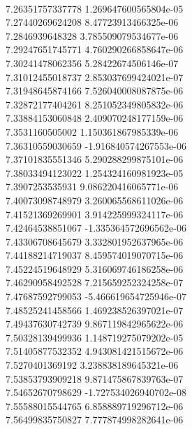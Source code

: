 { \\
7.26351757337778 1.269647600565804e-05
 \\
7.27440269624208 8.47723913466325e-06
 \\
7.2846939648328 3.785509079534677e-06
 \\
7.29247651745771 4.760290266858647e-06
 \\
7.30241478062356 5.28422674506146e-07
 \\
7.31012455018737 2.853037699424021e-07
 \\
7.31948645874166 7.526040008087875e-06
 \\
7.32872177404261 8.251052349805832e-06
 \\
7.33884153060848 2.409070248177159e-06
 \\
7.3531160505002 1.150361867985339e-06
 \\
7.36310559030659 -1.916840574267553e-06
 \\
7.37101835551346 5.290288299875101e-06
 \\
7.38033494123022 1.254324160981923e-05
 \\
7.3907253535931 9.086220416065771e-06
 \\
7.40073098748979 3.260065568611026e-06
 \\
7.41521369269901 3.914225999324117e-06
 \\
7.42464538851067 -1.335364572696562e-06
 \\
7.43306708645679 3.332801952637965e-06
 \\
7.44188214719037 8.459574019070715e-06
 \\
7.45224519648929 5.316069746186258e-06
 \\
7.46290958492528 7.215659252324258e-07
 \\
7.47687592799053 -5.466619654725946e-07
 \\
7.48525241458566 1.469238526397021e-07
 \\
7.49437630742739 9.867119842965622e-06
 \\
7.50328139499936 1.148719275079202e-05
 \\
7.51405877532352 4.943081421515672e-06
 \\
7.5270401369192 3.238838189645321e-06
 \\
7.53853793909218 9.871475867839763e-07
 \\
7.54652670798629 -1.727534026940702e-08
 \\
7.55588015544765 6.858889719296712e-06
 \\
7.56499835750827 7.777874998282641e-06
 \\
}
